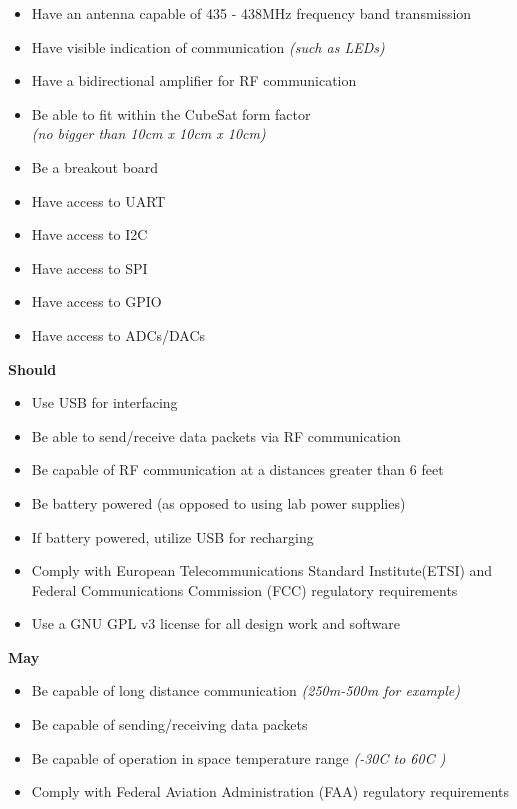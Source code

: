 \documentclass[12pt]{article}
\begin{document}
\begin{description}
\begin{itemize}
      			\item{Have an antenna capable of 435 - 438MHz frequency band transmission}
			\item{Have visible indication of communication \textit{(such as LEDs)}}
			\item{Have a bidirectional amplifier for RF communication}
			\item{Be able to fit within the CubeSat form factor\\ \textit{(no bigger than 10cm x 10cm x 10cm)}}
			\item{Be a breakout board}
			\item{Have access to UART}
			\item{Have access to I2C}
			\item{Have access to SPI}
			\item{Have access to GPIO}
			\item{Have access to ADCs/DACs}
		\end{itemize}
		\textbf{Should}
		\begin{itemize}
			\item{Use USB for interfacing}
			\item{Be able to send/receive data packets via RF communication}
			\item{Be capable of RF communication at a distances greater than 6 feet}
			\item{Be battery powered (as opposed to using lab power supplies) }
			\item{If battery powered, utilize USB for recharging}
			\item{Comply with European Telecommunications Standard Institute(ETSI) and Federal Communications Commission (FCC) regulatory requirements}
			\item{Use a GNU GPL v3 license for all design work and software} 
		\end{itemize}
		\textbf{May}
		\begin{itemize}
			\item{Be capable of long distance communication \textit{(250m-500m for example)}}
			\item{Be capable of sending/receiving data packets}
			\item{Be capable of operation in space temperature range \textit{(-30C to 60C )}}
			\item{Comply with Federal Aviation Administration (FAA) regulatory requirements}
		\end{itemize}
\end{description}
\end{document}
